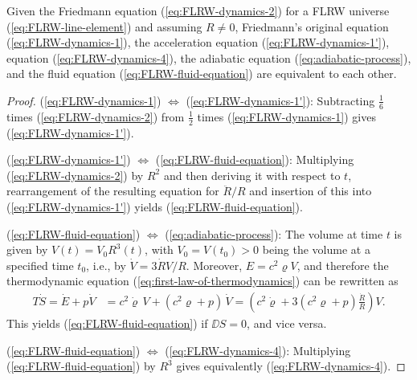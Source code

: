 \begin{satz}
	\label{theo:Friedmann-equation-equivalences}
	Given the Friedmann equation (\ref{eq:FLRW-dynamics-2}) for a FLRW universe (\ref{eq:FLRW-line-element}) and assuming $R \ne 0$,
	Friedmann's original equation (\ref{eq:FLRW-dynamics-1}),
	the acceleration equation (\ref{eq:FLRW-dynamics-1'}),
	equation (\ref{eq:FLRW-dynamics-4}),
	the adiabatic equation (\ref{eq:adiabatic-process}),
	and 
	the fluid equation (\ref{eq:FLRW-fluid-equation})
	are equivalent to each other.
\end{satz}
\begin{proof}
	(\ref{eq:FLRW-dynamics-1}) $\Leftrightarrow$ (\ref{eq:FLRW-dynamics-1'}):
	Subtracting $\frac{1}{6}$ times (\ref{eq:FLRW-dynamics-2}) from $\frac{1}{2}$ times (\ref{eq:FLRW-dynamics-1}) gives (\ref{eq:FLRW-dynamics-1'}).
	
	(\ref{eq:FLRW-dynamics-1'}) $\Leftrightarrow$ (\ref{eq:FLRW-fluid-equation}):
	Multiplying (\ref{eq:FLRW-dynamics-2}) by $R^2$ and then deriving it with respect to $t$, rearrangement of the resulting equation for $\ddot{R}/R$ and insertion of this into (\ref{eq:FLRW-dynamics-1'}) yields (\ref{eq:FLRW-fluid-equation}).

	(\ref{eq:FLRW-fluid-equation}) $\Leftrightarrow$ (\ref{eq:adiabatic-process}):
	The volume at time $t$ is given by $V(t) = V_0 R^3(t)$, with $V_0 = V(t_0) > 0$ being the volume at a specified time $t_0$, i.e., by 
	$\dot{V} = 3 \dot{R} V/R$.
	Moreover, $E = c^2 \varrho V$, and therefore the thermodynamic equation (\ref{eq:first-law-of-thermodynamics}) %
	can be rewritten as
	\begin{align*}
		T \dot{S} = \dot{E} + p \dot{V}
		& 
		= c^2 \dot{\varrho} \, V + (c^2 \varrho + p) \, \dot{V}
		= 
		\left(c^2 \dot{\varrho} + 3 \left(c^2 \varrho + p \right) \frac{\dot{R}}{R} \right) V
		.
	\end{align*}
	This yields (\ref{eq:FLRW-fluid-equation}) if $\DD S=0$, and vice versa.

	(\ref{eq:FLRW-fluid-equation}) $\Leftrightarrow$ (\ref{eq:FLRW-dynamics-4}): 
	Multiplying (\ref{eq:FLRW-fluid-equation}) by $R^3$ gives equivalently (\ref{eq:FLRW-dynamics-4}).
\end{proof}

